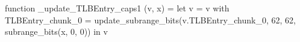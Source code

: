 function _update_TLBEntry_caps1 (v, x) = let v = { v with TLBEntry_chunk_0 = update_subrange_bits(v.TLBEntry_chunk_0, 62, 62, subrange_bits(x, 0, 0)) } in
  v

